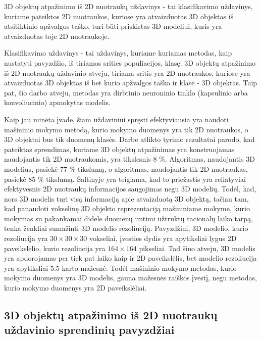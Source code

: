 
3D objektų atpažinimo iš 2D nuotraukų uždavinys - tai klasifikavimo uždavinys, kuriame pateiktos 2D nuotraukos, kuriose yra atvaizduotas 3D objektas iš atsitiktinio apžvalgos taško, turi būti priskirtas 3D modeliui, kuris yra atvaizduotas toje 2D nuotraukoje.

Klasifikavimo uždavinys - tai uždavinys, kuriame kuriamas metodas, kaip nustatyti pavyzdžio, iš tiriamos srities populiacijos, klasę. 3D objektų atpažinimo iš 2D nuotraukų uždavinio atveju, tiriama sritis yra 2D nuotraukos, kuriose yra atvaizduotas 3D objektas iš bet kurio apžvalgos taško ir klasė - 3D objektas. Taip pat, šio darbo atveju, metodas yra dirbtinio neuroninio tinklo (kapsulinio arba konvoliucinio) apmokytas modelis.

Kaip jau minėta įvade, šiam uždaviniui spręsti efektyviausia yra naudoti mašininio mokymo metodą, kurio mokymo duomenys yra tik 2D nuotraukos, o 3D objektai bus tik duomenų klasės. Darbe \cite{dbnExp} atlikto tyrimo rezultatai parodo, kad pateiktas sprendimas, kuriame 3D objektų atpažinimas yra konstruojamas naudojantis tik 2D nuotraukomis, yra tikslesnis 8 \%. Algoritmas, naudojantis 3D modelius, pasiekė 77 \% tikslumą, o algoritmas, naudojantis tik 2D nuotraukas, pasiekė 85 \% tikslumą. Šaltinyje \cite{cnnExp1} yra teigiama, kad to priežastis yra reliatyviai efektyvesnis 2D nuotraukų informacijos saugojimas negu 3D modelių. Todėl, kad, nors 3D modelis turi visą informaciją apie atvaizduotą 3D objektą, tačiau tam, kad panaudoti vokselinę 3D objekto reprezentaciją mašininiame mokyme, kurio mokymas su pakankamai didele duomenų imtimi užtruktų racionalų laiko tarpą, tenka ženkliai sumažinti 3D modelio rezoliuciją. Pavyzdžiui, 3D modelio, kurio rezoliucija yra $30\times30\times30$ vokseliai, įvesties dydis yra apytiksliai lygus 2D paveikslėlio, kurio rezoliucija yra $164\times164$ pikseliai. Tad šiuo atveju, 3D modelis yra apdorojamas per tiek pat laiko kaip ir 2D paveikslėlis, bet modelio rezoliucija yra apytiksliai 5.5 karto mažesnė. Todėl mašininio mokymo metodas, kurio mokymo duomenys yra 3D modelis, gauna mažesnės raiškos įvestį, negu metodas, kurio mokymo duomenys yra 2D paveikslėliai.

\subsection{3D objektų atpažinimo iš 2D nuotraukų uždavinio sprendinių pavyzdžiai}

